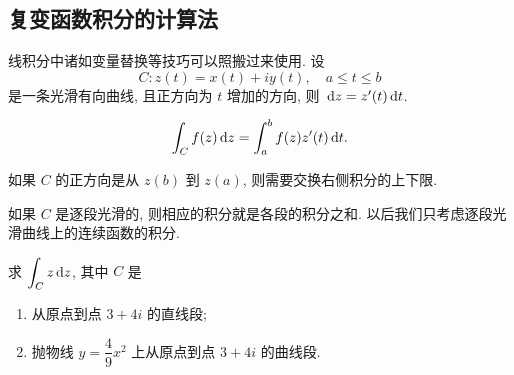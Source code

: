 \subsection{复变函数积分的计算法}

线积分中诸如变量替换等技巧可以照搬过来使用. 设
\[
	C:z(t)=x(t)+iy(t),\quad a\le t\le b
\]
是一条光滑有向曲线, 且正方向为 $t$ 增加的方向, 则 $\,\mathrm{d} z=z'(t)\,\mathrm{d} t$.

\begin{theorem}[复变函数积分计算方法I]
	\[
		\int_Cf(z)\,\mathrm{d} z=\int_a^b f(z)z'(t)\,\mathrm{d} t.
	\]
\end{theorem}
如果 $C$ 的正方向是从 $z(b)$ 到 $z(a)$, 则需要交换右侧积分的上下限.

如果 $C$ 是逐段光滑的, 则相应的积分就是各段的积分之和. 以后我们\alert{只考虑逐段光滑曲线上的连续函数的积分}.

\begin{example}
	求 $\displaystyle\int_Cz\,\mathrm{d} z$, 其中 $C$ 是
	\begin{enumerate}
		\item 从原点到点 $3+4i$ 的直线段;
		\item 抛物线 $y=\dfrac49x^2$ 上从原点到点 $3+4i$ 的曲线段.
	\end{enumerate}
\end{example}

\begin{figure}[hbpt]
	\centering
	\begin{minipage}{.48\textwidth}
		\centering
	\end{minipage}
	\begin{minipage}{.48\textwidth}
		\centering
	\end{minipage}
\end{figure}

